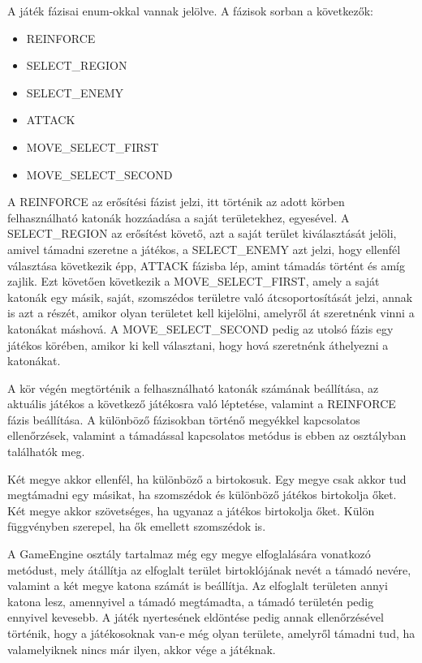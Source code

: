 A játék fázisai enum-okkal vannak jelölve. A fázisok sorban a következők: 

\begin{itemize}
\item REINFORCE 
\item SELECT\_REGION 
\item SELECT\_ENEMY
\item ATTACK 
\item MOVE\_SELECT\_FIRST 
\item MOVE\_SELECT\_SECOND
\end{itemize}

A REINFORCE az erősítési fázist jelzi, itt történik az adott körben felhasználható katonák hozzáadása a saját területekhez, egyesével. A SELECT\_REGION az erősítést követő, azt a saját terület kiválasztását jelöli, amivel támadni szeretne a játékos, a SELECT\_ENEMY azt jelzi, hogy ellenfél választása következik épp, ATTACK fázisba lép, amint támadás történt és amíg zajlik. Ezt követően következik a MOVE\_SELECT\_FIRST, amely a saját katonák egy másik, saját, szomszédos területre való átcsoportosítását jelzi, annak is azt a részét, amikor olyan területet kell kijelölni, amelyről át szeretnénk vinni a katonákat máshová. A MOVE\_SELECT\_SECOND pedig az utolsó fázis egy játékos körében, amikor ki kell választani, hogy hová szeretnénk áthelyezni a katonákat. 

A kör végén megtörténik a felhasználható katonák számának beállítása, az aktuális játékos a következő játékosra való léptetése, valamint a REINFORCE fázis beállítása. A különböző fázisokban történő megyékkel kapcsolatos ellenőrzések, valamint a támadással kapcsolatos metódus is ebben az osztályban találhatók meg. 

Két megye akkor ellenfél, ha különböző a birtokosuk. Egy megye csak akkor tud megtámadni egy másikat, ha szomszédok és különböző játékos birtokolja őket. Két megye akkor szövetséges, ha ugyanaz a játékos birtokolja őket. Külön függvényben szerepel, ha ők emellett szomszédok is. 

A GameEngine osztály tartalmaz még egy megye elfoglalására vonatkozó metódust, mely átállítja az elfoglalt terület birtoklójának nevét a támadó nevére, valamint a két megye katona számát is beállítja. Az elfoglalt területen annyi katona lesz, amennyivel a támadó megtámadta, a támadó területén pedig ennyivel kevesebb. A játék nyertesének eldöntése pedig annak ellenőrzésével történik, hogy a játékosoknak van-e még olyan területe, amelyről támadni tud, ha valamelyiknek nincs már ilyen, akkor vége a játéknak. 

